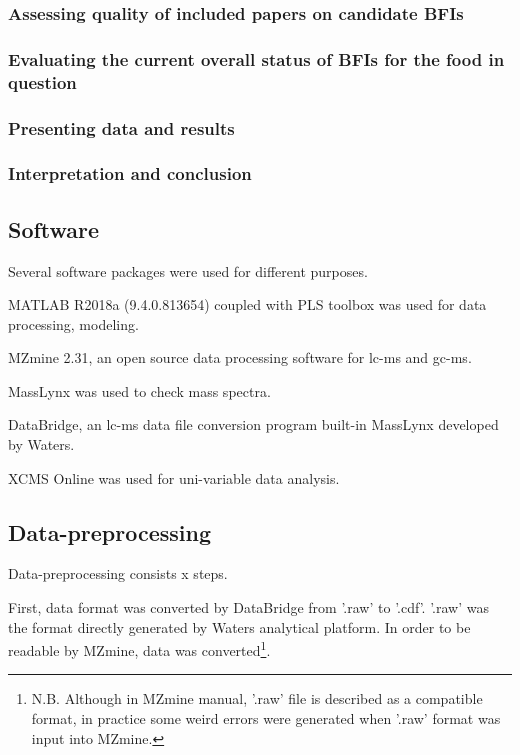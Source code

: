 \subsubsection{Assessing quality of included papers on candidate BFIs}


\subsubsection{Evaluating the current overall status of BFIs for the food in question}


\subsubsection{Presenting data and results}


\subsubsection{Interpretation and conclusion}

\subsection{Software}
Several software packages were used for different purposes.

MATLAB R2018a (9.4.0.813654) coupled with PLS toolbox was used for data processing, modeling.

MZmine 2.31, an open source data processing software for \acrshort{lc-ms} and \acrshort{gc-ms}. 

MassLynx was used to check mass spectra.

DataBridge, an \acrshort{lc-ms} data file conversion program built-in MassLynx developed by Waters.

XCMS Online was used for uni-variable data analysis.


\subsection{Data-preprocessing}
Data-preprocessing consists x steps.

First, data format was converted by DataBridge from '.raw' to '.cdf'. '.raw' was the format directly generated by Waters analytical platform. In order to be readable by MZmine, data was converted\footnote{N.B. Although in MZmine manual, '.raw' file is described as a compatible format, in practice some weird errors were generated when '.raw' format was input into MZmine.}.

